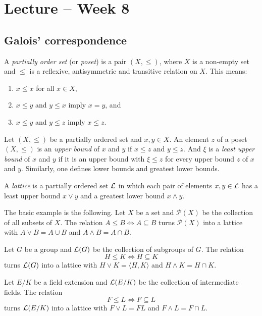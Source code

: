 \section{Lecture -- Week 8}

\subsection{Galois' correspondence}

A \emph{partially order set} (or \emph{poset}) is a pair $(X,\leq)$, where $X$ is a non-empty set
and $\leq$ is a reflexive, antisymmetric and transitive relation on $X$. This means:
\begin{enumerate}
    \item $x\leq x$ for all $x\in X$, 
    \item $x\leq y$ and $y\leq x$ imply $x=y$, and 
    \item $x\leq y$ and $y\leq z$ imply $x\leq z$. 
\end{enumerate}
Let $(X,\leq)$ be a partially ordered set and $x,y\in X$. 
An element $z$ of a poset $(X,\leq)$ is an \emph{upper bound} of $x$ and $y$ if 
$x\leq z$ and $y\leq z$. And $\xi$ 
is a \emph{least upper bound} of $x$ and $y$ 
if it is an upper bound with $\xi\leq z$ for every upper bound $z$ of $x$ and $y$. 
Similarly, one defines lower bounds and greatest lower bounds. 

\begin{definition}
    A \emph{lattice} is a partially ordered set $\mathcal{L}$ in which 
    each pair of elements $x,y\in \mathcal{L}$ has a least upper bound $x\vee y$ and a
    greatest lower bound $x\wedge y$. 
\end{definition}

The basic example is the following. 
Let $X$ be a set and $\mathcal{P}(X)$ be the collection of all subsets of $X$. The relation 
$A\leq B\Longleftrightarrow A\subseteq B$
turns $\mathcal{P}(X)$ into a lattice 
with $A\vee B=A\cup B$ and $A\wedge B=A\cap B$. 

\begin{example}
    Let $G$ be a group and $\mathcal{L}(G)$ be the collection of subgroups of $G$. The relation
    \[ 
    H\leq K\Longleftrightarrow H\subseteq K
    \] 
    turns $\mathcal{L}(G)$ into a lattice 
    with $H\vee K=\langle H,K\rangle$ and 
    $H\wedge K=H\cap K$. 
\end{example}

\begin{example}
    Let $E/K$ be a field extension and $\mathcal{L}(E/K)$ be the collection of 
    intermediate fields. The relation
    \[
    F\leq L\Longleftrightarrow F\subseteq L
    \]
    turns $\mathcal{L}(E/K)$ into a lattice with 
    $F\vee L=FL$ and $F\wedge L=F\cap L$. 
\end{example}

